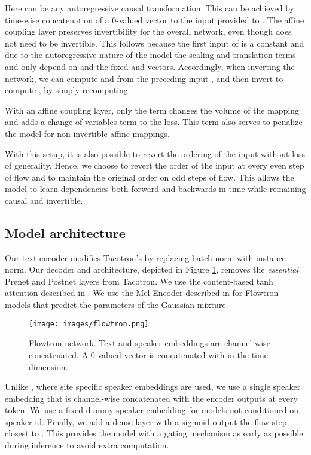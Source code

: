 \documentclass{article}
\begin{document}
Here  can be any autoregressive causal transformation. This can be achieved by time-wise concatenation of a 0-valued vector to the input provided to . The affine coupling layer preserves invertibility for the overall network, even though  does not need to be invertible. This follows because the first input of  is a constant and due to the autoregressive nature of the model the scaling and translation terms  and  only depend on  and the fixed  and  vectors. Accordingly, when inverting the network, we can compute  and  from the preceding input , and then invert  to compute , by simply recomputing . 

With an affine coupling layer, only the  term changes the volume of the mapping and adds a change of variables term to the loss. This term also serves to penalize the model for non-invertible affine mappings.


With this setup, it is also possible to revert the ordering of the input  without loss of generality. Hence, we choose to revert the order of the input at every even step of flow and to maintain the original order on odd steps of flow. This allows the model to learn dependencies both forward and backwards in time while remaining causal and invertible.

\subsection{Model architecture}
Our text encoder modifies Tacotron's by replacing batch-norm with instance-norm. Our decoder and  architecture, depicted in Figure \ref{fig:Flowtron}, removes the \textit{essential} Prenet and Postnet layers from Tacotron. We use the content-based tanh attention described in \cite{vinyals2015grammar}. We use the Mel Encoder described in \cite{hsu2018hierarchical} for Flowtron models that predict the parameters of the Gaussian mixture.

\begin{figure}[!ht]
    \centering
    \texttt{[image: images/flowtron.png]}
    \caption{Flowtron network. Text and speaker embeddings are channel-wise concatenated. A 0-valued vector is concatenated with  in the time dimension.}
    \label{fig:Flowtron}
\end{figure}

Unlike \cite{ping2017deep,gibiansky2017deep}, where site specific speaker embeddings are used, we use a single speaker embedding that is channel-wise concatenated with the encoder outputs at every token. We use a fixed dummy speaker embedding for models not conditioned on speaker id. Finally, we add a dense layer with a sigmoid output the flow step closest to . This provides the model with a gating mechanism as early as possible during inference to avoid extra computation.
\end{document}
